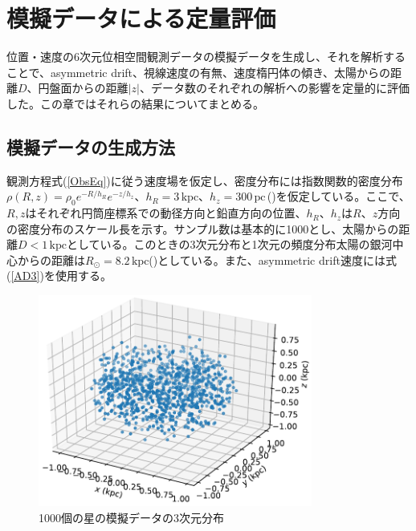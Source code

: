 \chapter{模擬データによる定量評価 \label{chapMock}}




位置・速度の6次元位相空間観測データの模擬データを生成し、それを解析することで、asymmetric drift、視線速度の有無、速度楕円体の傾き、太陽からの距離$D$、円盤面からの距離$|z|$、データ数のそれぞれの解析への影響を定量的に評価した。この章ではそれらの結果についてまとめる。


\section{模擬データの生成方法}
観測方程式(\ref{ObsEq})に従う速度場を仮定し、密度分布には指数関数的密度分布$\rho(R,z) = \rho_0 e^{-R/h_R} e^{-z/h_z}、h_R=3\,\mathrm{kpc}、h_z=300\,\mathrm{pc}$\,(\cite{BH2016})を仮定している。ここで、$R,z$はそれぞれ円筒座標系での動径方向と鉛直方向の位置、$h_R、h_z$は$R、z$方向の密度分布のスケール長を示す。サンプル数は基本的に1000とし、太陽からの距離$D<1\,\mathrm{kpc}$としている。このときの3次元分布と1次元の頻度分布太陽の銀河中心からの距離は$R_{\odot} = 8.2\,\mathrm{kpc}$(\cite{BH2016})としている。また、asymmetric drift速度には式(\ref{AD3})を使用する。

%

\begin{figure}[htbp]
\begin{center}
	\includegraphics[width=9cm]{fig/3dMockData.pdf}
	\caption{1000個の星の模擬データの3次元分布} \label{dist3dMockData}
\end{center}
\end{figure}

